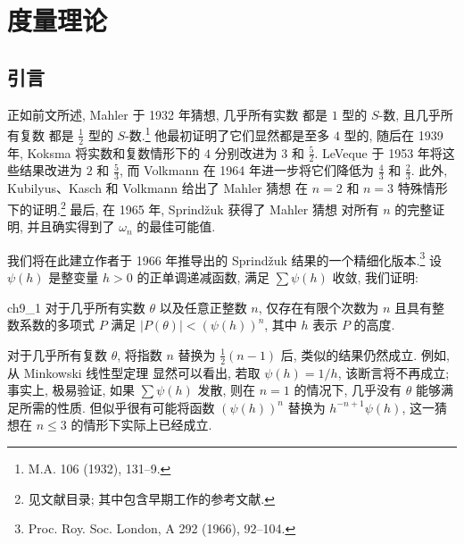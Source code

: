 
\chapter{度量理论}\label{ch:9}

\section{引言}\label{sec:ch9_1}

正如前文所述, Mahler 于 1932 年猜想, 几乎所有实数 都是 $1$ 型的 $S$-数, 且几乎所有复数 都是 $\frac{1}{2}$ 型的 $S$-数.\footnote{M.A. 106 (1932), 131--9.} 他最初证明了它们显然都是至多 $4$ 型的, 随后在 1939 年, Koksma 将实数和复数情形下的 $4$ 分别改进为 $3$ 和 $\frac{5}{2}$. LeVeque 于 1953 年将这些结果改进为 $2$ 和 $\frac{5}{3}$, 而 Volkmann 在 1964 年进一步将它们降低为 $\frac{4}{3}$ 和 $\frac{2}{3}$. 此外, Kubilyus、Kasch 和 Volkmann 给出了 Mahler 猜想 在 $n=2$ 和 $n=3$ 特殊情形下的证明.\footnote{见文献目录; 其中包含早期工作的参考文献.} 最后, 在 1965 年, Sprind\v{z}uk 获得了 Mahler 猜想 对所有 $n$ 的完整证明, 并且确实得到了 $\omega_n$ 的最佳可能值.

我们将在此建立作者于 1966 年推导出的 Sprind\v{z}uk 结果的一个精细化版本.\footnote{Proc. Roy. Soc. London, A 292 (1966), 92--104.} 设 $\psi(h)$ 是整变量 $h>0$ 的正单调递减函数, 满足 $\sum \psi(h)$ 收敛, 我们证明:

\begin{mythm}{}{ch9_1}
对于几乎所有实数 $\theta$ 以及任意正整数 $n$, 仅存在有限个次数为 $n$ 且具有整数系数的多项式 $P$ 满足 $|P(\theta)| < (\psi(h))^n$, 其中 $h$ 表示 $P$ 的高度.
\end{mythm}

对于几乎所有复数 $\theta$, 将指数 $n$ 替换为 $\frac{1}{2}(n-1)$ 后, 类似的结果仍然成立. 例如, 从 Minkowski 线性型定理 显然可以看出, 若取 $\psi(h) = 1/h$, 该断言将不再成立; 事实上, 极易验证, 如果 $\sum \psi(h)$ 发散, 则在 $n = 1$ 的情况下, 几乎没有 $\theta$ 能够满足所需的性质. 但似乎很有可能将函数 $(\psi(h))^n$ 替换为 $h^{-n+1}\psi(h)$, 这一猜想在 $n \leq 3$ 的情形下实际上已经成立.

